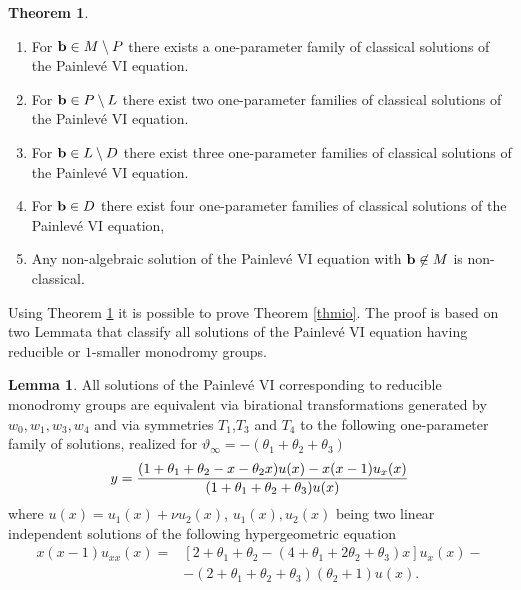 \documentclass[12pt]{article}
\def\thi{{\vartheta_\infty}}
\theoremstyle{definition}
\theoremstyle{theorem}
\newtheorem{lm}[df]{Lemma}
\newtheorem{thm}[df]{Theorem}
\begin{document}
\begin{thm}
\begin{enumerate}
\item For ${\bf b}\in M\setminus P$ there exists a one-parameter
family of classical solutions of the Painlev\'e VI equation.
\item For ${\bf b}\in P\setminus L$ there exist two one-parameter
families of classical solutions of the Painlev\'e VI equation.
\item For ${\bf b}\in L\setminus D$ there exist three one-parameter
families of classical solutions of the Painlev\'e VI equation.
\item For ${\bf b}\in D$ there exist four one-parameter families 
of classical solutions of the Painlev\'e VI equation,
\item Any non-algebraic solution of the Painlev\'e VI 
equation with ${\bf b}\not\in M$ is non-classical.
\end{enumerate}
\label{thw1}\end{thm}

Using Theorem \ref{thw1} it is possible to prove Theorem
\ref{thmio}. The proof is based on two Lemmata that classify
all solutions of the Painlev\'e VI equation having reducible or 
$1$-smaller monodromy groups. 

\begin{lm} All solutions of the Painlev\'e VI corresponding to reducible
monodromy groups are equivalent via birational transformations
generated by $w_0,w_1,w_3,w_4$ and via symmetries $T_1$,$T_3$ and $T_4$
to the following one-parameter family of solutions, realized for 
$\thi=-(\theta_1+\theta_2+\theta_3)$
\begin{equation}
y={(1+\theta_1+\theta_2-x-\theta_2 x) u(x) -x(x-1) u_x(x)
\over (1+\theta_1+\theta_2+\theta_3) u(x)}\label{ric}
\end{equation}
where $u(x)=u_1(x)+\nu u_2(x)$, $u_1(x),u_2(x)$ being two linear independent
solutions of the following hypergeometric equation 
\begin{equation}
\begin{array}{cl} x(x-1) u_{xx}(x)=&\left[2+\theta_1+\theta_2-
(4+\theta_1+2\theta_2+\theta_3)x\right] u_x(x)-\\
&-(2+\theta_1+\theta_2+\theta_3)(\theta_2+1) u(x).\\ 
\end{array} \label{hyp}
\end{equation}
\label{lmred}\end{lm}
\end{document}
